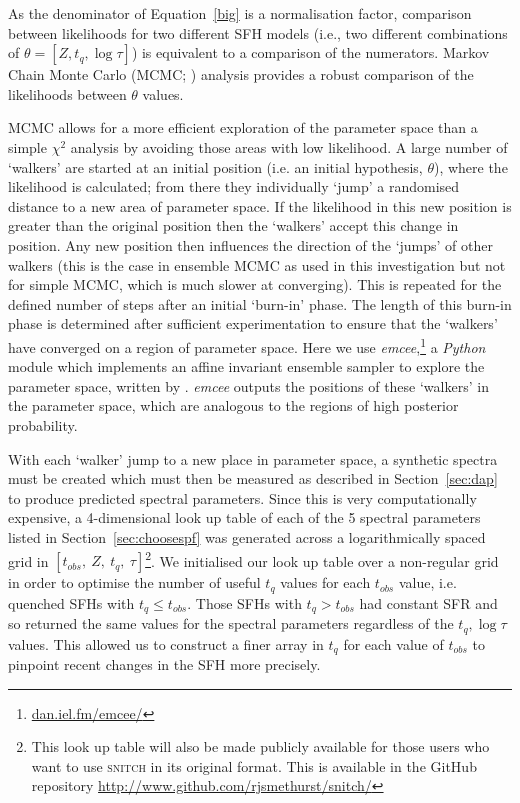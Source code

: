 \documentclass[useAMS,usenatbib]{mn2e}
\begin{document}
As the denominator of Equation~\ref{big} is a normalisation factor, comparison between likelihoods for two different SFH models (i.e., two different combinations of $\theta = [Z, t_q, \log \tau]$) is equivalent to a comparison of the numerators. Markov Chain Monte Carlo (MCMC; \citealt{mackay03, emcee13, GW10}) analysis provides a robust comparison of the likelihoods between $\theta$ values.

MCMC allows for a more efficient exploration of the parameter space than a simple $\chi^2$ analysis by avoiding those areas with low likelihood. A large number of `walkers' are started at an initial position (i.e. an initial hypothesis, $\theta$), where the likelihood is calculated; from there they individually `jump' a randomised distance to a new area of parameter space. If the likelihood in this new position is greater than the original position then the `walkers' accept this change in position. Any new position then influences the direction of the  `jumps' of other walkers (this is the case in ensemble MCMC as used in this investigation but not for simple MCMC, which is much slower at converging). This is repeated for the defined number of steps after an initial `burn-in' phase. The length of this burn-in phase is determined after sufficient experimentation to ensure that the `walkers' have converged on a region of parameter space. Here we use \emph{emcee},\footnote{\url{dan.iel.fm/emcee/}} a \emph{Python} module which implements an affine invariant ensemble sampler to explore the parameter space, written by \cite{emcee13}. \emph{emcee} outputs the positions of these `walkers' in the parameter space, which are analogous to the regions of high posterior probability. 



With each `walker' jump to a new place in parameter space, a synthetic spectra must be created which must then be measured as described in Section~\ref{sec:dap} to produce predicted spectral parameters. Since this is very computationally expensive, a 4-dimensional look up table of each of the 5 spectral parameters listed in Section~\ref{sec:choosespf} was generated across a logarithmically spaced grid in $[t_{obs},~Z,~t_q,~\tau]$\footnote{This look up table will also be made publicly available for those users who want to use \textsc{snitch} in its original format. This is available in the GitHub repository \url{http://www.github.com/rjsmethurst/snitch/}}. We initialised our look up table over a non-regular grid in order to optimise the number of useful $t_q$ values for each $t_{obs}$ value, i.e. quenched SFHs with $t_q \leq t_{obs}$. Those SFHs with $t_q > t_{obs}$ had constant SFR and so returned the same values for the spectral parameters regardless of the $t_q, \log\tau$ values. This allowed us to construct a finer array in $t_q$ for each value of $t_{obs}$ to pinpoint recent changes in the SFH more precisely.
\end{document}
